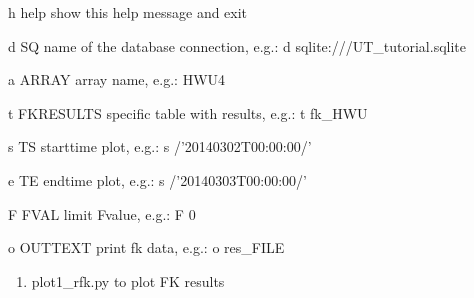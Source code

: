 \documentclass[letterpaper,10pt,english]{sphinxmanual}
\begin{document}
\begin{DUlineblock}{0em}
\item[] \sphinxhyphen{}h \textendash{}help     show this help message and exit
\item[] \sphinxhyphen{}d SQ         name of the database connection, e.g.: \sphinxhyphen{}d sqlite:///UT\_tutorial.sqlite
\item[] \sphinxhyphen{}a ARRAY      array name, e.g.: \sphinxhyphen{}HWU4
\item[] \sphinxhyphen{}t FKRESULTS  specific table with results, e.g.: \sphinxhyphen{}t fk\_HWU
\item[] \sphinxhyphen{}s TS        starttime plot, e.g.: \sphinxhyphen{}s /’2014\sphinxhyphen{}03\sphinxhyphen{}02T00:00:00/’
\item[] \sphinxhyphen{}e TE        endtime plot, e.g.: \sphinxhyphen{}s /’2014\sphinxhyphen{}03\sphinxhyphen{}03T00:00:00/’
\item[] \sphinxhyphen{}F FVAL      limit Fvalue, e.g.: \sphinxhyphen{}F 0
\item[] \sphinxhyphen{}o OUTTEXT    print fk data, e.g.: \sphinxhyphen{}o res\_FILE
\end{DUlineblock}

\begin{sphinxVerbatim}[commandchars=\\\{\}]
  \PYG{p}{[}\PYG{p}{]}         \PYG{p}{[} \PYG{p}{]} \PYG{p}{[} \PYG{p}{]} \PYG{p}{[} \PYG{p}{]}  
\end{sphinxVerbatim}
\begin{enumerate}
%
\setcounter{enumi}{2}
\item {} 
plot1\_rfk.py to plot FK results

\end{enumerate}
\end{document}
